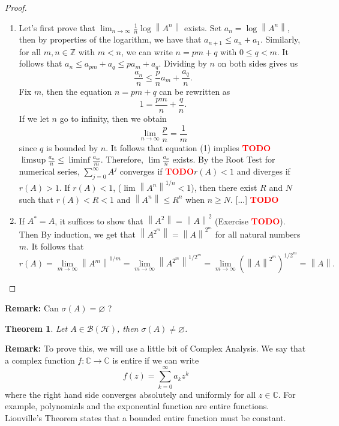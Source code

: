 \documentclass{article}
\newtheorem*{theorem}{Theorem}
\newcommand{\C}{\mathbb{C}}
\newcommand{\Z}{\mathbb{Z}}
\newcommand{\B}{\mathcal{B}}
\renewcommand{\H}{\mathcal{H}}
\newcommand{\norm}[1]{\left\lVert#1 \right\rVert}
\newcommand{\td}{\textcolor{red}{\textbf{TODO}}}
\newenvironment{remark}{\noindent\textbf{Remark:}}{}
\begin{document}
\begin{proof}
    \begin{enumerate}[label=(\alph*)]
        \item Let's first prove that $\lim_{n \rightarrow \infty}\frac{1}{n}\log\norm{A^n}$ exists. Set $a_n = \log \norm{A^n}$, then by properties of the logarithm, we have that $a_{n+1} \leq a_n + a_1$. Similarly, for all $m,n \in \Z$ with $m < n$, we can write $n = pm + q$ with $0 \leq q < m$. It follows that $a_n \leq a_{pm} + a_q \leq pa_m + a_q$. Dividing by $n$ on both sides gives us 
        \[\frac{a_n}{n} \leq \frac{p}{n}a_m + \frac{a_q}{n} \tag*{(1)}.\]
        Fix $m$, then the equation $n = pm + q$ can be rewritten as
        $$1 = \frac{pm}{n} + \frac{q}{n}.$$
        If we let $n$ go to infinity, then we obtain
        $$\lim_{n \rightarrow \infty}\frac{p}{n} = \frac{1}{m}$$
        since $q$ is bounded by $n$. It follows that equation (1) implies \td  $\limsup \frac{a_n}{n} \leq \liminf \frac{a_m}{m}$. Therefore, $\lim \frac{a_n}{n}$ exists. By the Root Test for numerical series, $\sum_{j=0}^{\infty}A^j$ converges if \td $r(A) < 1$ and diverges if $r(A) > 1$. If $r(A) < 1$, ($\lim \norm{A^n}^{1/n} < 1$), then there exist $R$ and $N$ such that $r(A) < R < 1$ and $\norm{A^n} \leq R^n$ when $n \geq N$. [...] \td 
        \item If $A^* = A$, it suffices to show that $\norm{A^2} = \norm{A}^2$ (Exercise \td). Then By induction, we get that $\norm{A^{2^m}} = \norm{A}^{2^m}$ for all natural numbers $m$. It follows that
        $$r(A) = \lim_{m\rightarrow\infty}\norm{A^m}^{1/m} = \lim_{m \rightarrow \infty}\norm{A^{2^m}}^{1/2^m} = \lim_{m \rightarrow \infty}(\norm{A}^{2^m})^{1/2^m} = \norm{A}.$$
    \end{enumerate}
\end{proof}

\begin{remark}
    Can $\sigma(A) = \varnothing$ ?
\end{remark}

\begin{theorem}
    Let $A \in \B(\H)$, then $\sigma(A) \neq \varnothing$.
\end{theorem}

\begin{remark}
    To prove this, we will use a little bit of Complex Analysis. We say that a complex function $f : \C \to \C$ is entire if we can write
    $$f(z) = \sum_{k=0}^{\infty}a_k z^k$$
    where the right hand side converges absolutely and uniformly for all $z \in \C$. For example, polynomials and the exponential function are entire functions. Liouville's Theorem states that a bounded entire function must be constant. 
\end{remark}
\end{document}
